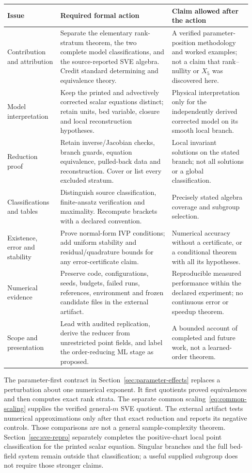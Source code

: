 \documentclass[11pt]{article}
\theoremstyle{definition}
\begin{document}
\begin{center}\small
\renewcommand{\arraystretch}{1.14}
\begin{tabularx}{\linewidth}{@{}p{3.1cm}XX@{}}
\toprule
Issue & Required formal action & Claim allowed after the action \\
\midrule
Contribution and attribution & Separate the elementary rank-stratum theorem, the two complete model classifications, and the source-reported SVE algebra. Credit standard determining and equivalence theory. & A verified parameter-position methodology and worked examples; not a claim that rank--nullity or $X_5$ was discovered here. \\
Model interpretation & Keep the printed and advectively corrected scalar equations distinct; retain units, bed variable, closure and local reconstruction hypotheses. & Physical interpretation only for the independently derived corrected model on its smooth local branch. \\
Reduction proof & Retain inverse/Jacobian checks, branch guards, equation equivalence, pulled-back data and reconstruction. Cover or list every excluded stratum. & Local invariant solutions on the stated branch; not all solutions or a global classification. \\
Classifications and tables & Distinguish source classification, finite-ansatz verification and maximality. Recompute brackets with a declared convention. & Precisely stated algebra coverage and subgroup selection. \\
Existence, error and stability & Prove normal-form IVP conditions; add uniform stability and residual/quadrature bounds for any error-certificate claim. & Numerical accuracy without a certificate, or a conditional theorem with all its hypotheses. \\
Numerical evidence & Preserve code, configurations, seeds, budgets, failed runs, references, environment and frozen candidate files in the external artifact. & Reproducible measured performance within the declared experiment; no continuous error or speedup theorem. \\
Scope and presentation & Lead with audited replication, derive the reducer from unrestricted point fields, and label the order-reducing ML stage as proposed. & A bounded account of completed and future work, not a learned-order theorem. \\
\bottomrule
\end{tabularx}
\end{center}

The parameter-first contract in Section~\ref{sec:parameter-effects} replaces a
perturbation about one numerical exponent. It first quotients proved
equivalences and then computes exact rank strata. The separate common
scaling~\eqref{eq:common-scaling} supplies the verified general-$m$ SVE
quotient. The external artifact tests numerical approximations only after that
exact reduction and reports its negative controls. Those comparisons are not a
general sample-complexity theorem. Section~\ref{sec:sve-repro} separately
completes the positive-chart local point classification for the printed
scalar equation. Singular branches and the full bed-field system remain
outside that classification; a useful supplied subgroup does not require
those stronger claims.
\end{document}
